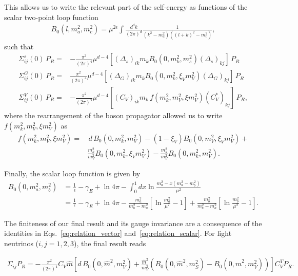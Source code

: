 This allows us to write the relevant part of the self-energy as functions of the scalar two-point loop function
\begin{align}
 B_0 (l, m_a^2,m_c^2) = \mu^{2\epsilon} \int \frac{d^d k}{(2 \pi)^d} \frac{1}{(k^2-m_a^2)( (l+k)^2 - m_c^2 )},
\end{align}
such that
\begin{align}
  \Sigma^s_{ij} (0) \, P_R =& -\frac{\pi^2}{(2\pi)^4} \mu^{d-4} \left[ (\Delta_s)_{ik} m_k B_0 (0,m_k^2, m_s^2) (\Delta_s)_{kj}\right] \, P_R \\
%
 \Sigma^G_{ij} (0) \, P_R =& \frac{\pi^2}{(2\pi)^4} \mu^{d-4} \left[ (\Delta_G)_{ik} m_k B_0 (0,m_k^2, \xi_V m_V^2) (\Delta_G)_{kj}\right] \, P_R \\
%
 \Sigma^V_{ij} (0) \, P_R =& -\frac{\pi^2}{(2 \pi)^4} \mu^{d-4} \left[ (C_V)_{ik} m_k \,f( m_k^2, m_V^2, \xi m_V^2) (C_V^*)_{kj} \right] \, P_R,
\end{align}
where the rearrangement of the boson propagator allowed us to write $f( m_k^2, m_V^2, \xi m_V^2)$ as
\begin{align*}
f( m_k^2, m_V^2, \xi m_V^2) =&\, d\, B_0(0,m_k^2, m_V^2) - (1-\xi_V) B_0 (0,m_V^2, \xi_V m_V^2) +\\ & \frac{m_k^2}{m_V^2} B_0 (0, m_k^2, \xi_V m_V^2) - \frac{m_k^2}{m_V^2} B_0 (0,  m_k^2, m_V^2). 
\end{align*}

Finally, the scalar loop function is given by
\begin{align*}
 B_0 (0,m_a^2,m_b^2) &= \frac{1}{\epsilon} - \gamma_E + \ln{4 \pi} - \int_0^1 dx \ln{\frac{m_a^2-x(m_a^2 - m_b^2)}{\mu^2}}\\
 &= \frac{1}{\epsilon} - \gamma_E + \ln{4 \pi} - \frac{m_a^2}{m_b^2 - m_a^2} \left[ \ln{\frac{m_a^2}{\mu^2}}  - 1 \right] + \frac{m_b^2}{m_b^2 - m_a^2} \left[ \ln{\frac{m_b^2}{\mu^2}}  - 1 \right].
\end{align*}

The finiteness of our final result and its gauge invariance are a consequence of the identities in Eqs.~\ref{eq:relation_vector} and~\ref{eq:relation_scalar}. For light neutrinos ($i,j=1,2,3$), the final result reads

\begin{align}
 \Sigma_{ij} P_R  = -\frac{\pi^2}{(2\pi)^4} C_V \hat{m}\left[ d\, B_0(0,\hat{m}^2,m_V^2) + \frac{\hat{m}^2}{m_V^2} \left( B_0 (0,\hat{m}^2,m_S^2) - B_0(0,\hat{m}^2,m_V^2) \right) \right] C^T_V P_R.
\end{align}

